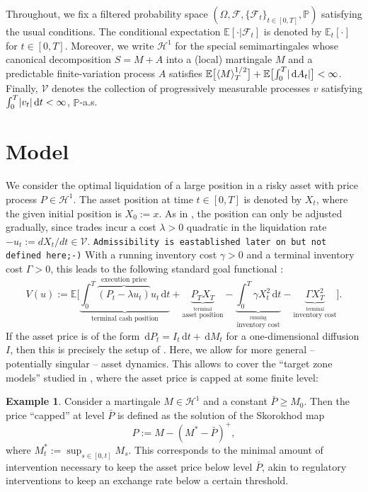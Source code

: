 \documentclass[11pt]{article}
\theoremstyle{definition}
\newtheorem{eg}[thm]{Example}
\theoremstyle{remark}
\newcommand{\E}{\mathbb{E}} %
\renewcommand{\P}{\mathbb{P}} %
\newcommand{\F}{\mathcal{F}} %
\DeclarePairedDelimiter{\abs}{\lvert}{\rvert} %
\newcommand{\ts}{\textstyle}
\newcommand{\de}{\,\mathrm{d}}
\begin{document}
Throughout, we fix a filtered probability space $(\Omega, \F, \{\F_t\}_{t\in[0,T]}, \P)$ satisfying the usual conditions. The conditional expectation $\E[\cdot \vert \F_t]$ is denoted by $\E_t[\cdot]$ for $t\in[0,T]$. Moreover, we write $\mathcal{H}^1$ for the special semimartingales whose canonical decomposition $S=M+A$ into a (local) martingale $M$ and a predictable finite-variation process $A$ satisfies $\E\bigl[\langle M\rangle^{1/2}_T\bigr] + \E\bigl[\int_0^T \abs{\de A_t}\bigr] < \infty$. Finally, $\mathcal{V}$ denotes the collection of progressively measurable processes $v$ satisfying $\int_0^T \abs{v_t} \de t < \infty$, $\P$-a.s.


\section{Model}\label{s:model}

We consider the optimal liquidation of a large position in a risky asset with price process $P \in \mathcal{H}^1$. The asset position at time $t \in [0,T]$ is denoted by $X_t$, where the given initial position is $X_0:=x$. As in \cite{almgren.chriss.01}, the position can only be adjusted gradually, since trades incur a cost $\lambda>0$ quadratic in the liquidation rate $-u_t := dX_t/dt \in \mathcal{V}$. \texttt{Admissibility is eastablished later on but not defined here;-)}
With a running inventory cost $\gamma>0$ and a terminal inventory cost $\Gamma>0$, this leads to the following standard goal functional \cite{almgren.chriss.01,???}:
\[
\ts V(u):= \E\Bigg[\underbrace{\int_0^T \overbrace{(P_t - \lambda u_t)}^{\textrm{execution price}} u_t \de t}_{\textrm{terminal cash position}} + \underbrace{P_T X_T}_{\stackrel{\textrm{terminal}}{\textrm{asset position}}} - \underbrace{\int_0^T \gamma X_t^2 \de t}_{\stackrel{\textrm{running}}{\textrm{inventory cost}}} - \underbrace{\Gamma X_T^2}_{\stackrel{\textrm{terminal}}{\textrm{inventory cost}}} \Bigg].
\]
If the asset price is of the form $\de P_t = I_t \de t + \de M_t$ for a one-dimensional diffusion $I$, then this is precisely the setup of \cite{lehalle2017incorporating}. Here, we allow for more general -- potentially singular -- asset dynamics. This allows to cover the ``target zone models'' studied in \cite{neumann.schied.??}, where the asset price is capped at some finite level:

\begin{eg}\label{ex:target}
Consider a martingale $M\in\mathcal{H}^1$ and a constant $\bar{P} \geq M_0$. Then the price ``capped'' at level $\bar{P}$ is defined as the solution of the Skorokhod map 
$$P:=M-(M^*-\bar{P})^+,$$
where $M^*_t:=\sup_{s\in[0,t]} M_s$. This corresponds to the minimal amount of intervention necessary to keep the asset price below level $\bar{P}$, akin to regulatory interventions to keep an exchange rate below a certain threshold.
\end{eg}
\end{document}

